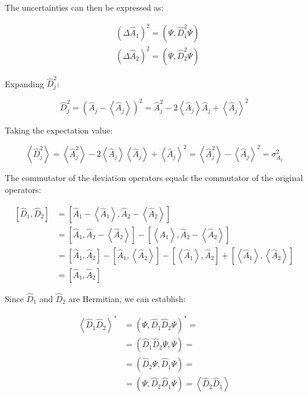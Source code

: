 \documentclass[italian]{HKNdocument}
\begin{document}
The uncertainties can then be expressed as:

\begin{align}
& \left(\Delta \hat{A}_{1}\right)^{2}=\left(\Psi, \hat{D}_{1}^{2} \Psi\right) \\
& \left(\Delta \hat{A}_{2}\right)^{2}=\left(\Psi, \hat{D}_{2}^{2} \Psi\right) \label{eq:7.6}
\end{align}

Expanding $\hat{D}_j^2$:

\begin{equation}
\hat{D}_{j}^{2}=\left(\hat{A}_{j}-\left\langle\hat{A}_{j}\right\rangle\right)^{2}=\hat{A}_{j}^{2}-2\left\langle\hat{A}_{j}\right\rangle \hat{A}_{j}+\left\langle\hat{A}_{j}\right\rangle^{2} \label{eq:7.7}
\end{equation}

Taking the expectation value:

\begin{equation}
\left\langle\hat{D}_{j}^{2}\right\rangle=\left\langle\hat{A}_{j}^{2}\right\rangle-2\left\langle\hat{A}_{j}\right\rangle\left\langle\hat{A}_{j}\right\rangle+\left\langle\hat{A}_{j}\right\rangle^{2}=\left\langle\hat{A}_{j}^{2}\right\rangle-\left\langle\hat{A}_{j}\right\rangle^{2}=\sigma_{A_{j}}^{2} \label{eq:7.8}
\end{equation}

The commutator of the deviation operators equals the commutator of the original operators:

\begin{align}
{\left[\hat{D}_{1}, \hat{D}_{2}\right] } & =\left[\hat{A}_{1}-\left\langle\hat{A}_{1}\right\rangle, \hat{A}_{2}-\left\langle\hat{A}_{2}\right\rangle\right] \\
& =\left[\hat{A}_{1}, \hat{A}_{2}-\left\langle\hat{A}_{2}\right\rangle\right]-\left[\left\langle\hat{A}_{1}\right\rangle, \hat{A}_{2}-\left\langle\hat{A}_{2}\right\rangle\right] \\
& =\left[\hat{A}_{1}, \hat{A}_{2}\right]-\left[\hat{A}_{1},\left\langle\hat{A}_{2}\right\rangle\right]-\left[\left\langle\hat{A}_{1}\right\rangle, \hat{A}_{2}\right]+\left[\left\langle\hat{A}_{1}\right\rangle,\left\langle\hat{A}_{2}\right\rangle\right]  \label{eq:7.9}\\
& =\left[\hat{A}_{1}, \hat{A}_{2}\right]
\end{align}

Since $\hat{D}_1$ and $\hat{D}_2$ are Hermitian, we can establish:

\begin{align}
\left\langle\hat{D}_{1} \hat{D}_{2}\right\rangle^{*} & =\left(\Psi, \hat{D}_{1} \hat{D}_{2} \Psi\right)^{*}= \\
& =\left(\hat{D}_{1} \hat{D}_{2} \Psi, \Psi\right)=  \label{eq:7.10}\\
& =\left(\hat{D}_{2} \Psi, \hat{D}_{1} \Psi\right)= \\
& =\left(\Psi, \hat{D}_{2} \hat{D}_{1} \Psi\right)=\left\langle\hat{D}_{2} \hat{D}_{1}\right\rangle
\end{align}
\end{document}
